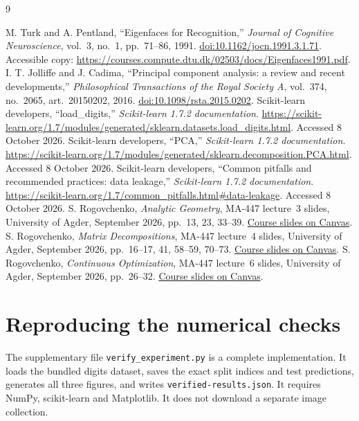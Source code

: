 \documentclass[11pt,a4paper,english]{article}
\numberwithin{equation}{section}
\begin{document}
\clearpage
{}
{}
\begin{thebibliography}{9}
\raggedright
{} M. Turk and A. Pentland, ``Eigenfaces for Recognition,'' \emph{Journal of Cognitive Neuroscience}, vol.~3, no.~1, pp.~71--86, 1991. \href{https://doi.org/10.1162/jocn.1991.3.1.71}{doi:10.1162/jocn.1991.3.1.71}. Accessible copy: \url{https://courses.compute.dtu.dk/02503/docs/Eigenfaces1991.pdf}.
 I. T. Jolliffe and J. Cadima, ``Principal component analysis: a review and recent developments,'' \emph{Philosophical Transactions of the Royal Society A}, vol.~374, no.~2065, art.~20150202, 2016. \href{https://doi.org/10.1098/rsta.2015.0202}{doi:10.1098/rsta.2015.0202}.
 Scikit-learn developers, ``load\_digits,'' \emph{Scikit-learn 1.7.2 documentation}. \url{https://scikit-learn.org/1.7/modules/generated/sklearn.datasets.load_digits.html}. Accessed 8 October 2026.
 Scikit-learn developers, ``PCA,'' \emph{Scikit-learn 1.7.2 documentation}. \url{https://scikit-learn.org/1.7/modules/generated/sklearn.decomposition.PCA.html}. Accessed 8 October 2026.
 Scikit-learn developers, ``Common pitfalls and recommended practices: data leakage,'' \emph{Scikit-learn 1.7.2 documentation}. \url{https://scikit-learn.org/1.7/common_pitfalls.html\#data-leakage}. Accessed 8 October 2026.
 S. Rogovchenko, \emph{Analytic Geometry}, MA-447 lecture~3 slides, University of Agder, September 2026, pp.~13, 23, 33--39. \href{https://uia.instructure.com/courses/20940/files/3391641?wrap=1}{Course slides on Canvas}.
 S. Rogovchenko, \emph{Matrix Decompositions}, MA-447 lecture~4 slides, University of Agder, September 2026, pp.~16--17, 41, 58--59, 70--73. \href{https://uia.instructure.com/courses/20940/files/3402207?wrap=1}{Course slides on Canvas}.
 S. Rogovchenko, \emph{Continuous Optimization}, MA-447 lecture~6 slides, University of Agder, September 2026, pp.~26--32. \href{https://uia.instructure.com/courses/20940/files/3421696?wrap=1}{Course slides on Canvas}.
\end{thebibliography}

\appendix
\section{Reproducing the numerical checks}
The supplementary file \texttt{verify\_experiment.py} is a complete implementation. It loads the bundled digits dataset, saves the exact split indices and test predictions, generates all three figures, and writes \texttt{verified-results.json}. It requires NumPy, scikit-learn and Matplotlib. It does not download a separate image collection.
\end{document}
